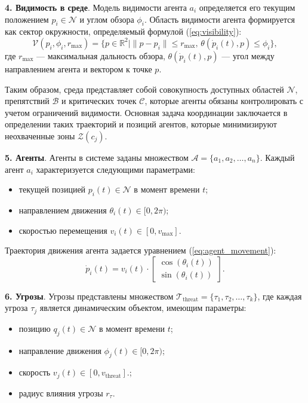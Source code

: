 \textbf{4. Видимость в среде}.  
Модель видимости агента $a_i$ определяется его текущим положением $p_i \in \mathcal{N}$ и углом обзора $\phi_i$.
Область видимости агента формируется как сектор окружности, определяемый формулой (\ref{eq:visibility}):
\begin{equation}
\mathcal{V}(p_i, \phi_i, r_{\text{max}}) = \{p \in \mathbb{R}^2 \mid \|p - p_i\| \leq r_{\text{max}}, \, \theta(\dot{p}_i(t), p) \leq \phi_i\},
\label{eq:visibility}
\end{equation}
где $r_{\text{max}}$ — максимальная дальность обзора, $\theta(\dot{p}_i(t), p)$ — угол между направлением агента и вектором к точке $p$.

Таким образом, среда представляет собой совокупность доступных областей $\mathcal{N}$, препятствий $\mathcal{B}$ и критических точек $\mathcal{C}$, которые агенты обязаны контролировать с учетом ограничений видимости.
Основная задача координации заключается в определении таких траекторий и позиций агентов, которые минимизируют неохваченные зоны $\mathcal{Z}(c_j)$.

\textbf{5. Агенты}.  
Агенты в системе заданы множеством $\mathcal{A} = \{a_1, a_2, \dots, a_n\}$.
Каждый агент $a_i$ характеризуется следующими параметрами:  
\begin{itemize}[leftmargin=1.6\parindent]
	\item текущей позицией $p_i(t) \in \mathcal{N}$ в момент времени $t$;  
	\item направлением движения $\theta_i(t) \in [0, 2\pi)$;  
	\item скоростью перемещения $v_i(t) \in [0, v_{\text{max}}]$.
\end{itemize}

Траектория движения агента задается уравнением (\ref{eq:agent_movement}):  
\begin{equation}
\dot{p}_i(t) = v_i(t) \cdot \begin{bmatrix}
	\cos(\theta_i(t)) \\
	\sin(\theta_i(t))
\end{bmatrix}.
\label{eq:agent_movement}
\end{equation}

\textbf{6. Угрозы}.  
Угрозы представлены множеством $\mathcal{T}_{\text{threat}} = \{\tau_1, \tau_2, \dots, \tau_k\}$, где каждая угроза $\tau_j$ является динамическим объектом, имеющим параметры:  
\begin{itemize}[leftmargin=1.6\parindent]
	\item позицию $q_j(t) \in \mathcal{N}$ в момент времени $t$;  
	\item направление движения $\phi_j(t) \in [0, 2\pi)$;  
	\item скорость $v_j(t) \in [0, v_{\text{threat}}]$.;
	\item радиус влияния угрозы $r_{\tau}$.
\end{itemize}

